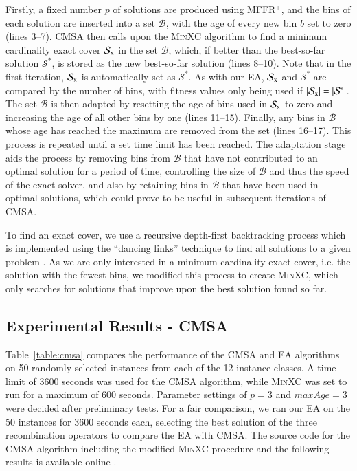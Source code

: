 \documentclass[authoryear]{elsarticle}
\begin{document}
Firstly, a fixed number $p$ of solutions are produced using MFFR$^+$, and the bins of each solution are inserted into a set $\mathcal{B}$, with the age of every new bin $b$ set to zero (lines 3--7). CMSA then calls upon the \textsc{MinXC} algorithm to find a minimum cardinality exact cover $\mathcal{S}_{\textup{x}}$ in the set $\mathcal{B}$, which, if better than the best-so-far solution $\mathcal{S}^*$, is stored as the new best-so-far solution (lines 8--10). Note that in the first iteration, $\mathcal{S}_{\textup{x}}$ is automatically set as $\mathcal{S}^*$. As with our EA, $\mathcal{S}_{\textup{x}}$ and $\mathcal{S}^*$ are compared by the number of bins, with fitness values only being used if $|\mathcal{S}_{\textup{x}}| = |\mathcal{S}^*|$. The set $\mathcal{B}$ is then adapted by resetting the age of bins used in $\mathcal{S}_{\textup{x}}$ to zero and increasing the age of all other bins by one (lines 11--15). Finally, any bins in $\mathcal{B}$ whose age has reached the maximum are removed from the set (lines 16--17). This process is repeated until a set time limit has been reached. The adaptation stage aids the process by removing bins from $\mathcal{B}$ that have not contributed to an optimal solution for a period of time, controlling the size of $\mathcal{B}$ and thus the speed of the exact solver, and also by retaining bins in $\mathcal{B}$ that have been used in optimal solutions, which could prove to be useful in subsequent iterations of CMSA.

To find an exact cover, we use a recursive depth-first backtracking process which is implemented using the ``dancing links'' technique to find all solutions to a given problem \citep{knuth2000}. As we are only interested in a minimum cardinality exact cover, i.e. the solution with the fewest bins, we modified this process to create \textsc{MinXC}, which only searches for solutions that improve upon the best solution found so far.

\subsection{Experimental Results - CMSA}
\label{sub:expcmsa}
\noindent Table~\ref{table:cmsa} compares the performance of the CMSA and EA algorithms on 50 randomly selected instances from each of the 12 instance classes. A time limit of 3600 seconds was used for the CMSA algorithm, while \textsc{MinXC} was set to run for a maximum of 600 seconds. Parameter settings of $p = 3$ and $maxAge = 3$ were decided after preliminary tests. For a fair comparison, we ran our EA on the 50 instances for 3600 seconds each, selecting the best solution of the three recombination operators to compare the EA with CMSA. The source code for the CMSA algorithm including the modified \textsc{MinXC} procedure and the following results is available online \citep{hawa2019cmsa}.
\end{document}
